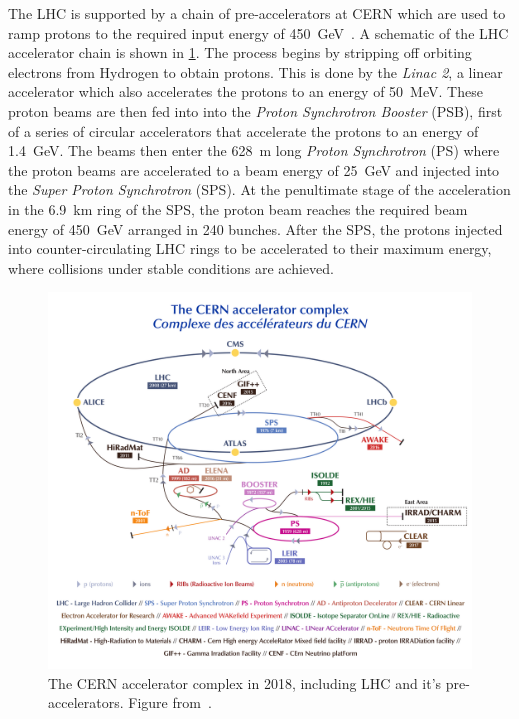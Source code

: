 The LHC is supported by a chain of pre-accelerators at CERN which are used to ramp protons to the 
required input energy of \SI{450}{\giga\eV}~\cite{LHCInjectorChain,LHCFacts}.
A schematic of the LHC accelerator chain is shown in \cref{fig:method:CERN-complex}.
The process begins by stripping off orbiting electrons from Hydrogen to obtain protons. This is 
done by the \emph{Linac 2}, a linear accelerator which also accelerates the protons to an energy 
of \SI{50}{\mega\eV}. These proton beams are then fed into into the \emph{Proton Synchrotron Booster} 
(PSB), first of a series of circular accelerators that accelerate the protons to an energy of 
\SI{1.4}{\giga\eV}. The beams then enter the \SI{628}{\meter} long \emph{Proton Synchrotron} (PS) 
where the proton beams are accelerated to a beam energy of \SI{25}{\giga\eV} and injected into the 
\emph{Super Proton Synchrotron} (SPS). At the penultimate stage of the acceleration in the 
\SI{6.9}{\kilo\meter} ring of the SPS, the proton beam reaches the required beam energy of 
\SI{450}{\giga\eV} arranged in 240 bunches. After the SPS, the protons injected into 
counter-circulating LHC rings to be accelerated to their maximum energy, where collisions under 
stable conditions are achieved.
\begin{figure}
    \centering
    \includegraphics[width=\textwidth]{images/CCC-v2018-print-v2.pdf}
    \caption[The CERN accelerator complex]{The CERN accelerator complex in 2018, including LHC and 
    it's pre-accelerators.
    Figure from~\cite{CERNComplex}.}
    \label{fig:method:CERN-complex}
\end{figure}

